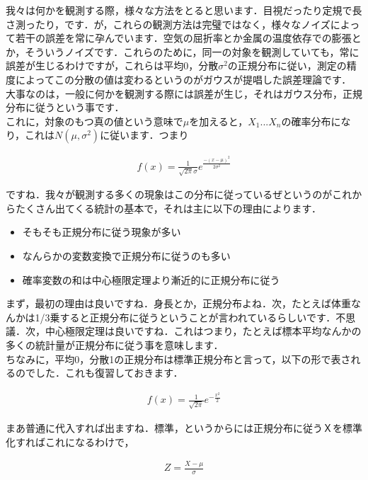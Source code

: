 \documentclass[11pt,a4paper,uplatex]{ujreport} 	%
\begin{document}
我々は何かを観測する際，様々な方法をとると思います．目視だったり定規で長さ測ったり，です．が，これらの観測方法は完璧ではなく，様々なノイズによって若干の誤差を常に孕んでいます．空気の屈折率とか金属の温度依存での膨張とか，そういうノイズです．これらのために，同一の対象を観測していても，常に誤差が生じるわけですが，これらは平均0，分散$\sigma^2$の正規分布に従い，測定の精度によってこの分散の値は変わるというのがガウスが提唱した誤差理論です．\\

大事なのは，一般に何かを観測する際には誤差が生じ，それはガウス分布，正規分布に従うという事です．\\

これに，対象のもつ真の値という意味で$\mu$を加えると，$X_1...X_n$の確率分布になり，これは$N(\mu, \sigma^2)$に従います．つまり

\begin{align}
  f(x) = \frac{1}{\sqrt{2\pi}\sigma}e^{\frac{-(x-\mu)^2}{2\sigma^2}}
\end{align}

ですね．我々が観測する多くの現象はこの分布に従っているぜというのがこれからたくさん出てくる統計の基本で，それは主に以下の理由によります．

\begin{itemize}
  \item そもそも正規分布に従う現象が多い
  \item なんらかの変数変換で正規分布に従うのも多い
  \item 確率変数の和は中心極限定理より漸近的に正規分布に従う
\end{itemize}

まず，最初の理由は良いですね．身長とか，正規分布よね．次，たとえば体重なんかは1/3乗すると正規分布に従うということが言われているらしいです．不思議．次，中心極限定理は良いですね．これはつまり，たとえば標本平均なんかの多くの統計量が正規分布に従う事を意味します．
\\

ちなみに，平均0，分散1の正規分布は標準正規分布と言って，以下の形で表されるのでした．これも復習しておきます．

\begin{align}
  f(x) = \frac{1}{\sqrt{2\pi}}e^{-\frac{x^2}{2}}
\end{align}

まあ普通に代入すれば出ますね．標準，というからには正規分布に従うＸを標準化すればこれになるわけで，

\begin{align}
  Z = \frac{X-\mu}{\sigma}
\end{align}
\end{document}
